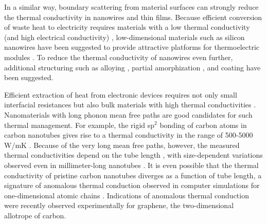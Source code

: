 In a similar way, boundary scattering from material surfaces can strongly reduce the thermal conductivity in nanowires and thin films. Because efficient conversion of waste heat to electricity requires materials with a low thermal conductivity (and high electrical conductivity) \cite{chen}, low-dimensional materials such as silicon nanowires have been suggested to provide attractive platforms for thermoelectric modules \cite{hochbaum08,boukai08}. To reduce the thermal conductivity of nanowires even further, additional structuring such as alloying \cite{garg11}, partial amorphization \cite{donadio09}, and coating \cite{hu11} have been suggested.


Efficient extraction of heat from electronic devices requires not only small interfacial resistances but also bulk materials with high thermal conductivities \cite{pop10}. Nanomaterials with long phonon mean free paths are good candidates for such thermal management. For example, the rigid sp$^2$ bonding of carbon atoms in carbon nanotubes \cite{iijima91} gives rise to a thermal conductivity in the range of 500-5000 W/mK \cite{marconnet13}. Because of the very long mean free paths, however, the measured thermal conductivities depend on the tube length \cite{chang08}, with size-dependent variations observed even in millimeter-long nanotubes \cite{chang_personal}. It is even possible that the thermal conductivity of pristine carbon nanotubes diverges as a function of tube length, a signature of anomalous thermal conduction observed in computer simulations for one-dimensional atomic chains \cite{lepri03,mai07,dhar08}. Indications of anomalous thermal conduction were recently observed experimentally \cite{xu14} for graphene, the two-dimensional allotrope of carbon.

